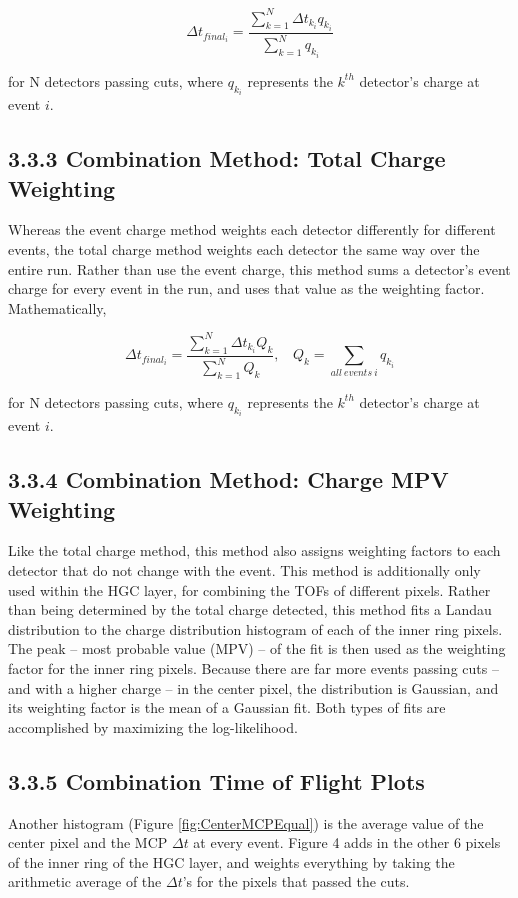 \documentclass[12pt]{article}
\begin{document}
\[
\Delta t_{final_i} =
\dfrac{\sum\limits_{k=1}^N \Delta t_{k_i} q_{k_i} }
	{\sum\limits_{k=1}^N q_{k_i} }
\]

for N detectors passing cuts, where $q_{k_i}$ represents the $k^{th}$ detector's charge at event $i$.

\subsection*{3.3.3 Combination Method: Total Charge Weighting}
Whereas the event charge method weights each detector differently for different events, the total charge method weights each detector the same way over the entire run. 
Rather than use the event charge, this method sums a detector's event charge for every event in the run, and uses that value as the weighting factor. 
Mathematically,

\[
\Delta t_{final_i} =
\dfrac{\sum\limits_{k=1}^N \Delta t_{k_i} Q_k }
	{\sum\limits_{k=1}^N Q_k }
,\ \ \ \ 
Q_k = \sum_{all\ events\ i} q_{k_i}
\]

for N detectors passing cuts, where $q_{k_i}$ represents the $k^{th}$ detector's charge at event $i$.

\subsection*{3.3.4 Combination Method: Charge MPV Weighting}
Like the total charge method, this method also assigns weighting factors to each detector that do not change with the event. 
This method is additionally only used within the HGC layer, for combining the TOFs of different pixels. 
Rather than being determined by the total charge detected, this method fits a Landau distribution to the charge distribution histogram of each of the inner ring pixels.
The peak -- most probable value (MPV) -- of the fit is then used as the weighting factor for the inner ring pixels. 
Because there are far more events passing cuts -- and with a higher charge -- in the center pixel, the distribution is Gaussian, and its weighting factor is the mean of a Gaussian fit.
Both types of fits are accomplished by maximizing the log-likelihood.

\subsection*{3.3.5 Combination Time of Flight Plots}


Another histogram (Figure \ref{fig:CenterMCPEqual}) is the average value of the center pixel and the MCP $\Delta t$ at every event. 
Figure 4 adds in the other 6 pixels of the inner ring of the HGC layer, and weights everything by taking the arithmetic average of the $\Delta t$’s for the pixels that passed the cuts.
\end{document}

